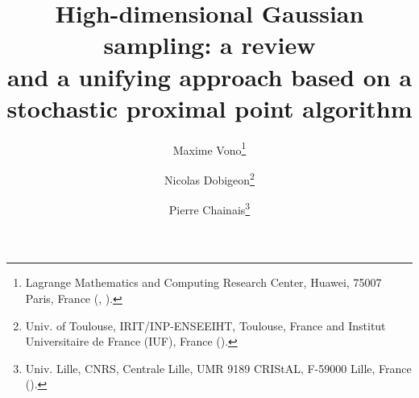 \title{High-dimensional Gaussian sampling: a review \\and a unifying approach based on a stochastic proximal point algorithm}

\author{Maxime Vono\thanks{Lagrange Mathematics and Computing Research Center, Huawei, 75007 Paris, France 
  (, \urlnew).}
  \and Nicolas Dobigeon\thanks{Univ. of Toulouse, IRIT/INP-ENSEEIHT, Toulouse, France and Institut Universitaire de France (IUF), France
  ().}
\and Pierre Chainais\thanks{Univ. Lille, CNRS, Centrale Lille, UMR 9189 CRIStAL, F-59000 Lille, France 
  ().}}

\usepackage{amsopn}
\DeclareMathOperator{\diag}{diag}
\usepackage{color}
